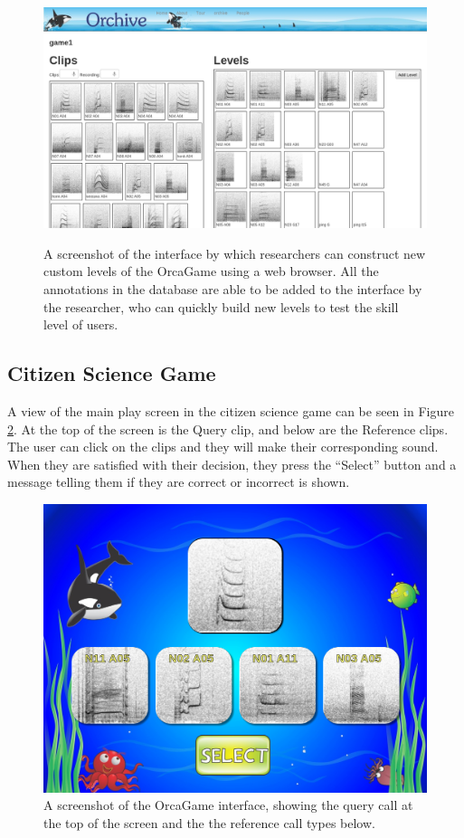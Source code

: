 \begin{figure}[t]
\centering
\includegraphics[width=\columnwidth]{figures/orchiveV2gameBuilder}
\label{fig:orchiveV2gameBuilder}
\caption{A screenshot of the interface by which researchers can
  construct new custom levels of the OrcaGame using a web browser.
  All the annotations in the database are able to be added to the
  interface by the researcher, who can quickly build new levels to
  test the skill level of users.}
\end{figure}

\subsection{Citizen Science Game}

A view of the main play screen in the citizen science game can be seen
in Figure \ref{fig:OrcaGame}.  At the top of the screen is the Query
clip, and below are the Reference clips.  The user can click on the
clips and they will make their corresponding sound.  When they are
satisfied with their decision, they press the ``Select'' button and a
message telling them if they are correct or incorrect is shown.

\begin{figure}[h]
\centering
\includegraphics[width=\columnwidth]{figures/orcagame}
\caption{A screenshot of the OrcaGame interface, showing the query
  call at the top of the screen and the the reference call types below.}
\label{fig:OrcaGame}
\end{figure}

